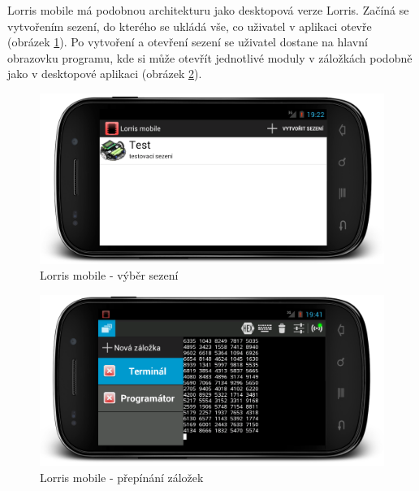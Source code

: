 \documentclass[12pt, a4paper, oneside]{article}
\begin{document}
Lorris mobile má podobnou architekturu jako desktopová verze Lorris. Začíná se vytvořením sezení, do kterého se ukládá vše, co uživatel v aplikaci otevře (obrázek \ref{mobile_session}). Po vytvoření a otevření sezení se uživatel dostane na hlavní obrazovku programu, kde si může otevřít jednotlivé moduly v záložkách podobně jako v desktopové aplikaci (obrázek \ref{mobile_tabs}).

\begin{figure}[H]
\begin{center}
\includegraphics[width=\textwidth]{img/mobile_session.png}
\caption{Lorris mobile - výběr sezení}
\label{mobile_session}
\end{center}
\end{figure}
\begin{figure}[H]
\begin{center}
\includegraphics[width=\textwidth]{img/mobile_tabs.png}
\caption{Lorris mobile - přepínání záložek}
\label{mobile_tabs}
\end{center}
\end{figure}
\end{document}
